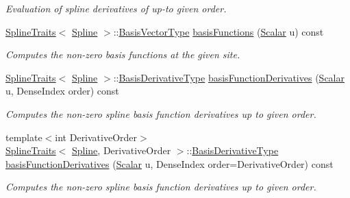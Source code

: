 \begin{DoxyCompactItemize}
\begin{DoxyCompactList}\small\item\em Evaluation of spline derivatives of up-\/to given order. \end{DoxyCompactList}\item 
\hyperlink{struct_eigen_1_1_spline_traits}{Spline\+Traits}$<$ \hyperlink{group___splines___module_class_eigen_1_1_spline}{Spline} $>$\+::\hyperlink{group___splines___module_a1d49cef942ea59d85d1711ee32354e6b}{Basis\+Vector\+Type} \hyperlink{group___splines___module_a4a1999b276b61196267d322a1b6d8b5a}{basis\+Functions} (\hyperlink{group___splines___module_a8cafd78b564825c76fbb3419653d9742}{Scalar} u) const
\begin{DoxyCompactList}\small\item\em Computes the non-\/zero basis functions at the given site. \end{DoxyCompactList}\item 
\hyperlink{struct_eigen_1_1_spline_traits}{Spline\+Traits}$<$ \hyperlink{group___splines___module_class_eigen_1_1_spline}{Spline} $>$\+::\hyperlink{group___splines___module_a9db0b0108353660cd03524f2e67d6b3c}{Basis\+Derivative\+Type} \hyperlink{group___splines___module_a54c268e55c0e2418f698ec59703c155d}{basis\+Function\+Derivatives} (\hyperlink{group___splines___module_a8cafd78b564825c76fbb3419653d9742}{Scalar} u, Dense\+Index order) const
\begin{DoxyCompactList}\small\item\em Computes the non-\/zero spline basis function derivatives up to given order. \end{DoxyCompactList}\item 
{\footnotesize template$<$int Derivative\+Order$>$ }\\\hyperlink{struct_eigen_1_1_spline_traits}{Spline\+Traits}$<$ \hyperlink{group___splines___module_class_eigen_1_1_spline}{Spline}, Derivative\+Order $>$\+::\hyperlink{group___splines___module_a9db0b0108353660cd03524f2e67d6b3c}{Basis\+Derivative\+Type} \hyperlink{group___splines___module_acd36d8b5a4f57eb1d7f27989ac6d54ac}{basis\+Function\+Derivatives} (\hyperlink{group___splines___module_a8cafd78b564825c76fbb3419653d9742}{Scalar} u, Dense\+Index order=Derivative\+Order) const
\begin{DoxyCompactList}\small\item\em Computes the non-\/zero spline basis function derivatives up to given order. \end{DoxyCompactList}\item 
\mbox{\label{group___splines___module_a0df23e941ac0f31dcd095a4dd4f4a7ec}} 

\end{DoxyCompactItemize}
